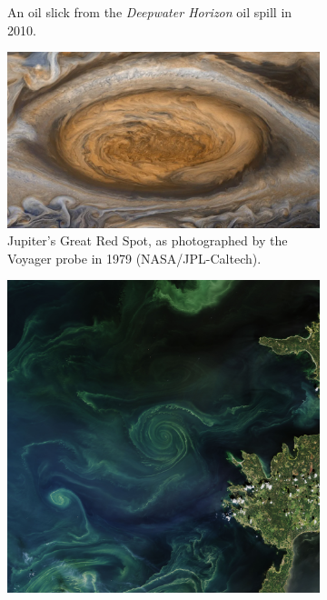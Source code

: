 \begin{figure}
	\begin{center}
		\begin{subfigure}{0.49\textwidth}
			\caption{An oil slick from the \emph{Deepwater Horizon} oil spill in 2010.}
		\end{subfigure}
		\begin{subfigure}{0.49\textwidth}
			\includegraphics[width=\textwidth]{chp02_background/figures/red_spot.png}
			\caption{Jupiter's Great Red Spot, as photographed by the Voyager probe in 1979 (NASA/JPL-Caltech).}
		\end{subfigure}
		\begin{subfigure}{0.49\textwidth}
			\includegraphics[width=\textwidth]{chp02_background/figures/photoplankton}

\end{subfigure}
\end{center}
\end{figure}
